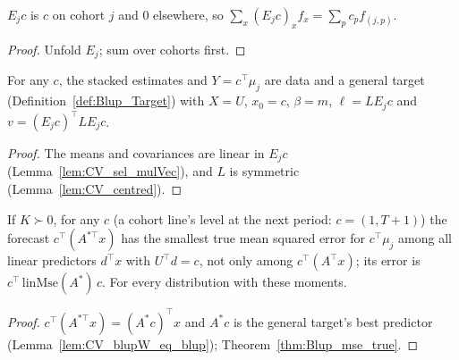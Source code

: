\begin{lemma}\label{lem:CV_sel_mulVec}
  \leanok
  $E_jc$ is $c$ on cohort $j$ and $0$ elsewhere, so $\sum_x (E_jc)_x f_x = \sum_p c_p f_{(j,p)}$.
\end{lemma}
\begin{proof}
  \leanok
  Unfold $E_j$; sum over cohorts first.
\end{proof}

\begin{lemma}\label{lem:CV_toTarget}
  \leanok
  For any $c$, the stacked estimates and $Y = c^\top\mu_j$ are data and a general target
  (Definition~\ref{def:Blup_Target}) with $X = U$, $x_0 = c$, $\beta = m$, $\ell = LE_jc$ and
  $v = (E_jc)^\top L E_jc$.
\end{lemma}
\begin{proof}
  \leanok
  The means and covariances are linear in $E_jc$ (Lemma~\ref{lem:CV_sel_mulVec}), and
  $L$ is symmetric (Lemma~\ref{lem:CV_centred}).
\end{proof}

\begin{theorem}\label{thm:CV_forecast}
  \leanok
  If $K \succ 0$, for any $c$ (a cohort line's level at the next period: $c = (1, T + 1)$) the
  forecast $c^\top(A^{\ast\top}x)$ has the smallest true mean squared error for $c^\top\mu_j$ among
  all linear predictors $d^\top x$ with $U^\top d = c$, not only among $c^\top(A^\top x)$; its error is
  $c^\top\,\mathrm{linMse}(A^\ast)\,c$. For every distribution with these moments.
\end{theorem}
\begin{proof}
  \leanok
  $c^\top(A^{\ast\top}x) = (A^\ast c)^\top x$ and $A^\ast c$ is the general target's best predictor
  (Lemma~\ref{lem:CV_blupW_eq_blup}); Theorem~\ref{thm:Blup_mse_true}.
\end{proof}

